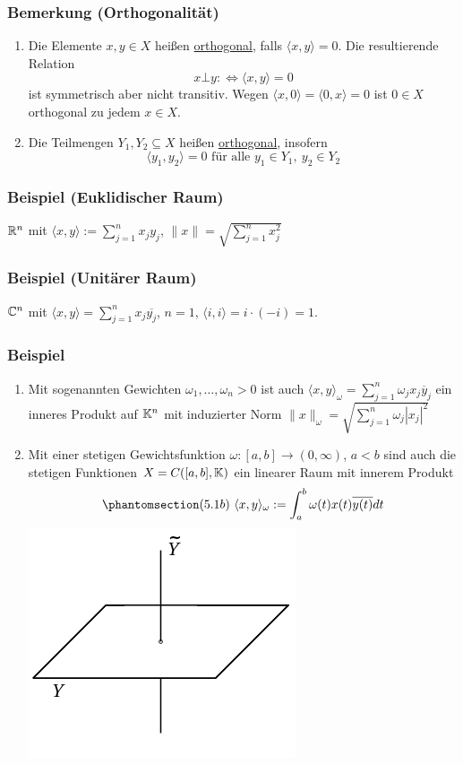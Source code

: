 \subsubsection{Bemerkung (Orthogonalität)}
\begin{enumerate}
\item Die Elemente $x,y\in X$ heißen \underline{orthogonal}, falls $\langle x,y\rangle=0$.  Die resultierende Relation 
\[x \bot y :\Leftrightarrow \langle x,y\rangle=0\]
ist symmetrisch aber nicht transitiv.  Wegen $\langle x,0\rangle=\langle0,x\rangle=0$ ist $0\in X$ orthogonal zu jedem $x\in X$.
\item Die Teilmengen $Y_1,Y_2\subseteq X$ heißen \underline{orthogonal}, insofern
\[\langle y_1,y_2\rangle=0\text{ für alle }y_1\in Y_1,\ y_2\in Y_2\]
\end{enumerate}
\subsubsection{Beispiel (Euklidischer Raum)}
$\mathbb{R} ^n$ mit $\langle x,y\rangle:=\sum _{j=1}^n x_jy_j$, $\|x\|=\sqrt{\sum _{j=1}^nx_j^2}$
\subsubsection{Beispiel (Unitärer Raum)}
$\mathbb{C} ^n$ mit $\langle x,y\rangle=\sum _{j=1}^n x_j \overline{y_j}$, $n=1$, $\langle i,i\rangle=i\cdot (-i)=1$.
\subsubsection{Beispiel}
\label{5.1.6}
\numbers
\begin{enumerate}
\item Mit sogenannten Gewichten $\omega_1,\dots,\omega_n>0$ ist auch $\langle x,y \rangle_\omega=\sum_{j=1}^n \omega_j x_j \overline{y}_j$ ein inneres Produkt auf $\mathbb{K}^n$ mit induzierter Norm $\|x\|_\omega= \sqrt{\sum_{j=1}^n \omega_j |x_j|^2}$
\item Mit einer stetigen Gewichtsfunktion $\omega\colon[a,b]\rightarrow(0,\infty)$, $a<b$ sind auch die stetigen Funktionen $X=C([a,b],\mathbb{K})$ ein linearer Raum mit innerem Produkt
\[\phantomsection\label{5.1b}(5.1b)\ \langle x, y\rangle_\omega:=\int_a^b \omega(t)x(t)\overline{y(t)}dt\]
\includegraphics[scale=0.4]{5-1-6.jpg}
\end{enumerate}
